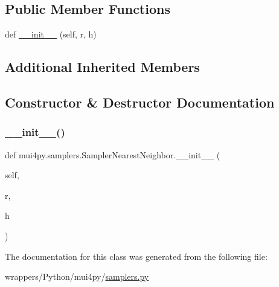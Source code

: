 \subsection*{Public Member Functions}
\begin{DoxyCompactItemize}
\item 
def \hyperlink{classmui4py_1_1samplers_1_1_sampler_nearest_neighbor_a82e32d8b0ac463cf53150f56ba2bdc9d}{\+\_\+\+\_\+init\+\_\+\+\_\+} (self, r, h)
\end{DoxyCompactItemize}
\subsection*{Additional Inherited Members}


\subsection{Constructor \& Destructor Documentation}
\mbox{\label{classmui4py_1_1samplers_1_1_sampler_nearest_neighbor_a82e32d8b0ac463cf53150f56ba2bdc9d}} 
\subsubsection{\texorpdfstring{\+\_\+\+\_\+init\+\_\+\+\_\+()}{\_\_init\_\_()}}
{\footnotesize\ttfamily def mui4py.\+samplers.\+Sampler\+Nearest\+Neighbor.\+\_\+\+\_\+init\+\_\+\+\_\+ (\begin{DoxyParamCaption}\item[{}]{self,  }\item[{}]{r,  }\item[{}]{h }\end{DoxyParamCaption})}



The documentation for this class was generated from the following file\+:\begin{DoxyCompactItemize}
\item 
wrappers/\+Python/mui4py/\hyperlink{samplers_8py}{samplers.\+py}\end{DoxyCompactItemize}
